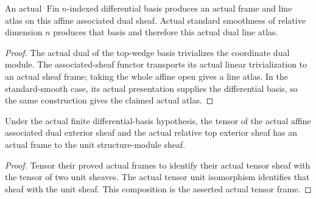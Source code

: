 \begin{theorem}
\label{sc0-canonical-port:ext:actual-affine-dual-exterior-frame}
\leanok
An actual \(\operatorname{Fin}n\)-indexed differential
basis produces an actual frame and line atlas on this
affine associated dual sheaf. Actual standard smoothness
of relative dimension \(n\) produces that basis and
therefore this actual dual line atlas.
\end{theorem}
\begin{proof}
The actual dual of the top-wedge basis trivializes the
coordinate dual module. The associated-sheaf functor
transports its actual linear trivialization to an
actual sheaf frame; taking the whole affine open gives
a line atlas. In the standard-smooth case, its actual
presentation supplies the differential basis, so the
same construction gives the claimed actual atlas.
\end{proof}

\begin{theorem}
\label{sc0-canonical-port:ext:actual-affine-exterior-dual-tensor-frame}
\leanok
Under the actual finite differential-basis hypothesis,
the tensor of the actual affine associated dual exterior
sheaf and the actual relative top exterior sheaf has
an actual frame to the unit structure-module sheaf.
\end{theorem}
\begin{proof}
Tensor their proved actual frames to identify their
actual tensor sheaf with the tensor of two unit sheaves.
The actual tensor unit isomorphism identifies that
sheaf with the unit sheaf. This composition is the
asserted actual tensor frame.
\end{proof}

